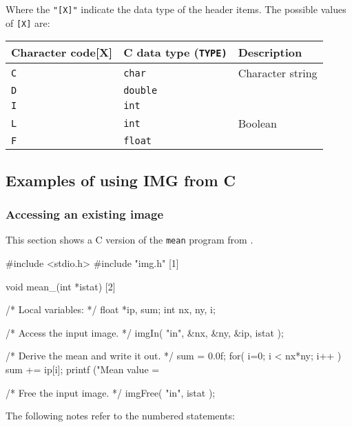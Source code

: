 \documentclass[twoside,11pt,nolof]{starlink}
\providecommand{\myverb}[1]{{\texttt{#1}}}
\providecommand{\mynote}{The following notes refer to the numbered statements:}
\newenvironment{code}{\begin{small}}
                     {\end{small}}
\begin{document}
\label{HDRCdatatypes}
Where the \texttt{"[X]"} indicate the data type of the header items.
The possible values of \texttt{[X]} are:
\begin{small}
\begin{center}
\begin{tabular}{||l|l|l||}
\hline
Character code[X] & C data type (\texttt{TYPE)} &  Description      \\
\hline
 \texttt{C}          & \texttt{char}               &  Character string \\
 \texttt{D}          & \texttt{double}             &  \\
 \texttt{I}          & \texttt{int}                &  \\
 \texttt{L}          & \texttt{int}                &  Boolean          \\
 \texttt{F}          & \texttt{float}              &  \\
\hline
\end{tabular}
\end{center}
\end{small}

\subsection{Examples of using IMG from C}
\subsubsection{Accessing an existing image}
This section shows a C version of the \myverb{mean} program from
.
\begin{code}
\begin{terminalv}
#include <stdio.h>
#include "img.h"                                              [1]

void mean_(int *istat)                                        [2]
{
  /* Local variables: */
  float *ip, sum;
  int nx, ny, i;

  /*  Access the input image. */
  imgIn( "in", &nx, &ny, &ip, istat );

  /*  Derive the mean and write it out. */
  sum = 0.0f;
  for( i=0; i < nx*ny; i++ ) sum += ip[i];
  printf ("Mean value = %

  /*  Free the input image. */
  imgFree( "in", istat );
}
\end{terminalv}
\end{code}

\mynote
\end{document}
